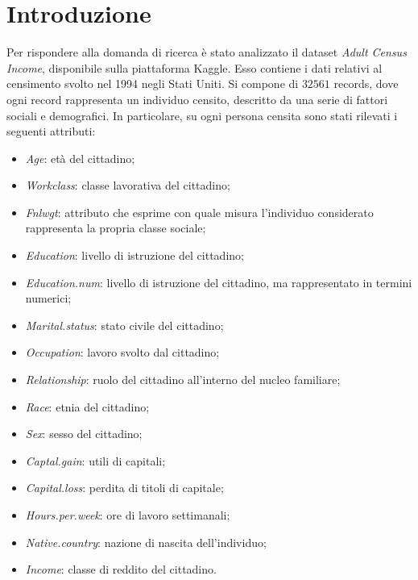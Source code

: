 \documentclass[fleqn,10pt]{SelfArx}
\affiliation{\textsuperscript{1}\textit{Dipartimento di Informatica, Università degli Studi di Milano-Bicocca, CdLM: Data Science}}
\begin{document}
\flushbottom

\maketitle
\tableofcontents

\thispagestyle{empty} 

\section*{Introduzione}
Per rispondere alla domanda di ricerca è stato analizzato il dataset \textit{Adult Census Income}, disponibile sulla piattaforma Kaggle. Esso contiene i dati relativi al censimento svolto nel 1994 negli Stati Uniti. Si compone di $\num{32561}$ records, dove ogni record rappresenta un individuo censito, descritto da una serie di fattori sociali e demografici. In particolare, su ogni persona censita sono stati rilevati i seguenti attributi:
\begin{itemize}
    \item \textit{Age}: età del cittadino;
    \item \textit{Workclass}: classe lavorativa del cittadino;
    \item \textit{Fnlwgt}: attributo che esprime con quale misura l'individuo considerato rappresenta la propria classe sociale;
    \item \textit{Education}: livello di istruzione del cittadino;
    \item \textit{Education.num}: livello di istruzione del cittadino, ma rappresentato in termini numerici;
    \item \textit{Marital.status}: stato civile del cittadino;
    \item \textit{Occupation}: lavoro svolto dal cittadino;
    \item \textit{Relationship}: ruolo del cittadino all'interno del nucleo familiare;
    \item \textit{Race}: etnia del cittadino;
    \item \textit{Sex}: sesso del cittadino;
    \item \textit{Captal.gain}: utili di capitali;
    \item \textit{Capital.loss}: perdita di titoli di capitale;
    \item \textit{Hours.per.week}: ore di lavoro settimanali;
    \item \textit{Native.country}: nazione di nascita dell'individuo;
    \item \textit{Income}: classe di reddito del cittadino.
    
\end{itemize}
\end{document}
